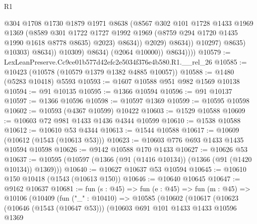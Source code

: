 \begin{lexlean}{R1}
\begin{coremodule}
                                    @304
                                    @1708
                                    @1730
                                    @1879
                                    @1971
                                    @8638
                                    (@8567
                                      @302
                                      @101
                                      @1728
                                      @1433
                                      @1969
                                      @1369
                                      (@8589
                                        @301
                                        @1722
                                        @1727
                                        @1992
                                        @1969
                                        (@8759 @294 @1720 @1435 @1990 @1618 @8778 @8635)
                                        @2023)
                                      @8634))
                                  @2029)
                                @8634))
                            @10297)
                          @8635)
                        @10303)
                      @8634))
                  @10309)
                @8634)
              (@2064 @10000))
            @8634))))
@10579 := LexLeanPreserve.Cc9ce01b577d42efc2e5034f376e4b580.R1.__rel_26
@10585 := @10423 (@10578 (@10579 @1379 @1382 @4885 @10057))
@10588 := @1480 (@5283 @10418) @5593
@10593 := @1607 @10588 @951 @982 @1569 @10138
@10594 := @91 @10135
@10595 := @1366 @10594
@10596 := @91 @10137
@10597 := @1366 @10596
@10598 := @10597 @1369
@10599 := @10595 @10598
@10602 := @10593 (@4367 @10599) @10422
@10603 := @1529 @10588
@10609 := @10603 @72 @981 @1433 @1436 @4344 @10599
@10610 := @1538 @10588
@10612 := @10610 @53 @4344
@10613 := @1544 @10588
@10617 := @10609 (@10612 (@1543 (@10613 @53)))
@10623 := @10603 @776 @693 @1433 @1435 @10594 @10598
@10626 := @9142 @10588 @170 @1433
@10627 := @10626 @53
@10637 := @10595 (@10597 (@1366 (@91 (@1416 @10134)) (@1366 (@91 (@1420 @10134)) @1369)))
@10640 := @10627 @10637 @53 @10594
@10645 := @10610 @150 @10418 (@1543 (@10613 @150))
@10646 := @10640 @10645
@10647 := @9162 @10637
@10681 := fun (s : @45) =>
  fun (e : @45) =>
  fun (m : @45) =>
  @10106
    (@10409
      (fun ("_" : @10410) =>
      @10585
        (@10602
          (@10617
            (@10623
              (@10646 (@1543 (@10647 @53)))
              (@10603
                @691
                @101
                @1433
                @1433
                @10596
                @1369

\end{coremodule}
\end{lexlean}
